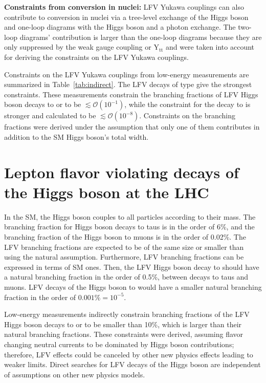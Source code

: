 \textbf{Constraints from \mte conversion in nuclei:} LFV Yukawa couplings can also contribute to \mte conversion in nuclei via a tree-level exchange of the Higgs boson and one-loop diagrams with the Higgs boson and a photon exchange. The two-loop diagrams' contribution is larger than the one-loop diagrams because they are only suppressed by the weak gauge coupling or $\mathrm{Y_{tt}}$ and were taken into account for deriving the constraints on the LFV Yukawa couplings.

Constraints on the LFV Yukawa couplings from low-energy measurements are summarized in Table~\ref{tab:indirect}. The LFV decays of type \liljg give the strongest constraints. These measurements constrain the branching fractions of LFV Higgs boson decays to \mutau or \etau to be $\lesssim \mathcal{O}(10^{-1})$, while the constraint for the decay to \emm is stronger and calculated to be $\lesssim \mathcal{O}(10^{-8})$. Constraints on the branching fractions were derived under the assumption that only one of them contributes in addition to the SM Higgs boson's total width.




\section{Lepton flavor violating decays of the Higgs boson at the LHC}

In the SM, the Higgs boson couples to all particles according to their mass. The branching fraction for Higgs boson decays to taus is in the order of 6\%, and the branching fraction of the Higgs boson to muons is in the order of 0.02\%. The LFV branching fractions are expected to be of the same size or smaller than \BHij using the natural assumption. Furthermore, LFV branching fractions \BHij can be expressed in terms of SM ones. Then, the LFV Higgs boson decay to \mutau should have a natural branching fraction in the order of 0.5\%, between decays to taus and muons. LFV decays of the Higgs boson to \etau would have a smaller natural branching fraction in the order of $0.001\% = 10^{-5}$.

Low-energy measurements indirectly constrain branching fractions of the LFV Higgs boson decays to \mutau or \etau to be smaller than 10\%, which is larger than their natural branching fractions. These constraints were derived, assuming flavor changing neutral currents to be dominated by Higgs boson contributions; therefore, LFV effects could be canceled by other new physics effects leading to weaker limits. Direct searches for LFV decays of the Higgs boson are independent of assumptions on other new physics models.

